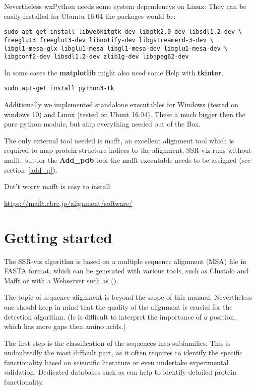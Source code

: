 \documentclass[a4paper,10pt]{article}
\begin{document}
Nevertheless wxPython needs some system dependencys on Linux:
They can be easily installed for Ubuntu 16.04 the packages would be:

\begin{verbatim}
sudo apt-get install libwebkitgtk-dev libgtk2.0-dev libsdl1.2-dev \
freeglut3 freeglut3-dev libnotify-dev libgstreamerd-3-dev \
libgl1-mesa-glx libglu1-mesa libgl1-mesa-dev libglu1-mesa-dev \
libgconf2-dev libsdl1.2-dev zlib1g-dev libjpeg62-dev
\end{verbatim}

In some cases the \textbf{matplotlib} might also need some Help with \textbf{tkinter}.

\begin{verbatim}
sudo apt-get install python3-tk
\end{verbatim}

Additionally we implemented standalone 
executables for Windows (tested on windows 10) and Linux (tested on Ubunt 16.04).
These a much bigger then the pure python module, but ship everything needed out of
the Box. 

The only external tool needed is mafft, an excellent alignment tool which is 
required to map protein structure indices to the alignment. SSR-viz runs
without mafft, but for the \textbf{Add\_pdb} tool the mafft executable needs 
to be assigned (see section~\ref{add_p}).

Dnt't worry mafft is easy to install:

\url{https://mafft.cbrc.jp/alignment/software/}


\section{Getting started}

The SSR-viz algorithm is based on a multiple sequence alignment (MSA) file in 
FASTA format, which can be generated with various tools, such as Clustalo 
and Mafft or with a Webserver such as (). 

The topic of sequence alignment is beyond the scope of this manual.  
Nevertheless one should keep in mind that 
the quality of the alignment is crucial for the detection algorithm.
(Is is difficult to interpret the importance of a position, which has
more gaps then amino acids.)

The first step is the classification of the sequences into subfamilies.
This is undoubtedly the most difficult part, as it often requires 
to identify the specific functionality based on scientific literature
or even undertake experimental validation. Dedicated databases such as 
\todo{add some DB} can help to identify 
detailed protein functionality. 
\end{document}
